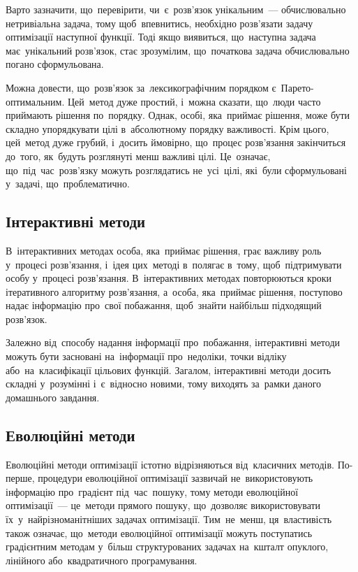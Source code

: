 \documentclass[
  a4paper,
  oneside,
  BCOR = 10mm,
  DIV = 12,
  12pt,
  headings = normal,
]{scrartcl}
\begin{document}
        Варто зазначити, що~перевірити, чи~є~розв'язок унікальним~— обчислювально нетривіальна задача, тому щоб~впевнитись, необхідно розв'язати задачу оптимізації наступної функції. Тоді якщо виявиться, що~наступна задача має~унікальний розв'язок, стає зрозумілим, що~початкова задача обчислювально погано сформульована.

        Можна довести, що~розв'язок за~лексикографічним порядком є~Парето-оптимальним. Цей~метод дуже простий, і~можна сказати, що~люди часто приймають рішення по~порядку. Однак, особі, яка~приймає рішення, може бути складно упорядкувати цілі в~абсолютному порядку важливості. Крім цього, цей~метод дуже грубий, і~досить ймовірно, що~процес розв'язання закінчиться до~того, як~будуть розглянуті менш важливі цілі. Це~означає, що~під~час~розв'язку можуть розглядатись не~усі~цілі, які~були сформульовані у~задачі, що~проблематично.

    \subsection{Інтерактивні методи}
      В~інтерактивних методах особа, яка~приймає рішення, грає важливу роль у~процесі розв'язання, і~ідея цих~методі в~полягає в~тому, щоб~підтримувати особу у~процесі розв'язання. В~інтерактивних методах повторюються кроки ітеративного алгоритму розв'язання, а~особа, яка~приймає рішення, поступово надає інформацію про~свої побажання, щоб~знайти найбільш підходящий розв'язок.

      Залежно від~способу надання інформації про~побажання, інтерактивні методи можуть бути засновані на~інформації про~недоліки, точки відліку або~на~класифікації цільових функцій. Загалом, інтерактивні методи досить складні у~розумінні і~є~відносно новими, тому виходять за~рамки даного домашнього завдання.

    \subsection{Еволюційні методи}
      Еволюційні методи оптимізації істотно відрізняються від~класичних методів. По-перше, процедури еволюційної оптимізації зазвичай не~використовують інформацію про~градієнт під~час~пошуку, тому методи еволюційної оптимізації~— це~методи прямого пошуку, що~дозволяє використовувати їх~у~найрізноманітніших задачах оптимізації. Тим~не~менш, ця~властивість також означає, що~методи еволюційної оптимізації можуть поступатись градієнтним методам у~більш структурованих задачах на~кшталт опуклого, лінійного або~квадратичного програмування.
\end{document}
